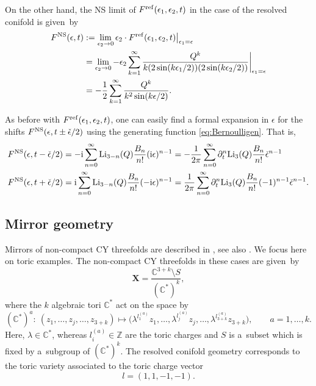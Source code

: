 \documentclass[pdftex]{sigma}
\numberwithin{equation}{section}
\begin{document}
On the other hand, the NS limit of $F^{\rm ref}(\epsilon_1,\epsilon_2,t)$ in the case of the resolved conifold is given~by
\begin{align}
 F^{\rm NS}(\epsilon,t)&:= \lim_{\epsilon_2 \rightarrow 0} \epsilon_2\cdot F^{\rm ref}(\epsilon_1,\epsilon_2,t) \big{|}_{\epsilon_1=\epsilon}\nonumber\\
 &=\lim_{\epsilon_2 \rightarrow 0} -\epsilon_2 \sum_{k=1}^{\infty} \frac{Q^k}{k(2 \sin (k\epsilon_1/2)) (2\sin (k\epsilon_2/2))} \bigg{|}_{\epsilon_1=\epsilon}\nonumber\\
 &=- \frac{1}{2} \sum_{k=1}^{\infty} \frac{Q^k}{k^2 \sin(k\epsilon/2)}.\label{def:FNS}
\end{align}

As before with $F^{\rm ref}(\epsilon_1,\epsilon_2,t)$, one can easily find a formal expansion in $\epsilon$ for the shifts $F^{\rm NS}(\epsilon,t\pm \check\epsilon/2)$ using the generating function \eqref{eq:Bernoulligen}. That is,
\begin{align}
 F^{\rm NS}(\epsilon,t-\check{\epsilon}/2)&= -\mathrm{i} \sum_{n=0}^{\infty} {\rm Li}_{3-n}(Q) \frac{B_n}{n!} (\mathrm{i}\epsilon)^{n-1}=-\frac{1}{2\pi} \sum_{n=0}^{\infty} \partial_t^n {\rm Li}_{3}(Q) \frac{B_n}{n!} \check{\epsilon}^{n-1}\nonumber\\
 F^{\rm NS}(\epsilon,t+\check{\epsilon}/2)&=\mathrm{i}\sum_{n=0}^{\infty}\mathrm{Li}_{3-n}(Q)\frac{B_n}{n!}(-\mathrm{i}\epsilon)^{n-1}=\frac{1}{2\pi} \sum_{n=0}^{\infty} \partial_t^n {\rm Li}_{3}(Q) \frac{B_n}{n!} (-1)^{n-1}\check{\epsilon}^{n-1}.\label{eq:FNSasymp}
\end{align}

\subsection{Mirror geometry}\label{appendix:mirrorsymmetry}
Mirrors of non-compact CY threefolds are described in \cite{Chianglocal,Hori:2000kt, Katz:1997eq}, see also \cite{Hosonolocal}. We focus here on toric examples. The non-compact CY threefolds in these cases are given~by
\begin{equation*}
 \mathbf{X}= \frac{\mathbb{C}^{3+k}\setminus S}{(\mathbb{C}^*)^k},
\end{equation*}
where the $k$ algebraic tori $\mathbb{C}^*$ act on the space by
 \begin{equation*}
 (\mathbb{C}^*)^a \colon \ (z_1,\dots,z_j,\dots, z_{3+k}) \mapsto \big(\lambda^{l^{(a)}_1} z_1,\dots,\lambda^{l^{(a)}_j} z_j,\dots,\lambda^{l^{(a)}_{3+k}} z_{3+k}\big), \qquad a=1,\dots,k.
\end{equation*}
 Here, $\lambda \in \mathbb{C}^*$, whereas $l^{(a)}_{i} \in \mathbb{Z}$ are the toric charges and $S$ is a~subset which is fixed by a~subgroup of $(\mathbb{C}^*)^k$. The resolved conifold geometry corresponds to the toric variety associated to the toric charge vector
\begin{equation*}
l=(1,1,-1,-1).
\end{equation*}
\end{document}
